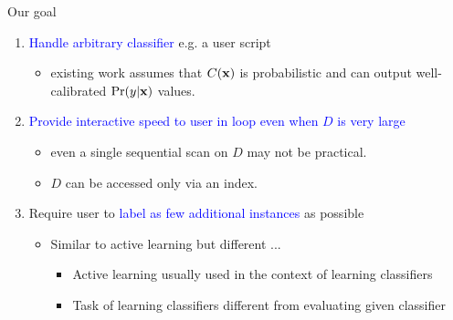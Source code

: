 \documentclass[usenames,dvipsnames, 11pt]{beamer}
\newcommand{\vek}[1]{{\bf {#1}}}
\newcommand{\vx}{{\vek{x}}}
\newlength{\wideitemsep}
\let\olditem\item
\renewcommand{\item}{\setlength{\itemsep}{\wideitemsep}\olditem}
\begin{document}
\begin{frame}{Our goal}
\begin{enumerate}
\pause
\item \textcolor{blue}{Handle arbitrary classifier} e.g. a user script
  \begin{itemize}
  \item existing work assumes that $C(\vx)$ is probabilistic and can output well-calibrated $\Pr(y|\vx)$ values.
  \end{itemize}
  \pause
\item \textcolor{blue}{Provide interactive speed to user in loop even when $D$ is very large}
  \begin{itemize}
  \item even a single sequential scan on $D$ may not be practical. 
  \item $D$ can be accessed only via an index.
  \end{itemize}
  \pause
\item Require user to \textcolor{blue}{label as few additional instances} as possible
  \begin{itemize}
  \item Similar to active learning but different ...
  \begin{itemize}
  \item Active learning usually used in the context of learning classifiers
  \item Task of learning classifiers different from evaluating given classifier
  \end{itemize}
  \end{itemize}
  \end{enumerate}
\end{frame}
\end{document}
